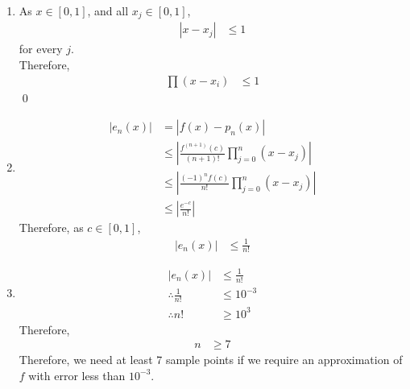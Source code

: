 \documentclass[fleqn, a4paper, 11pt, oneside]{amsart}
\theoremstyle{definition}
\theoremstyle{theorem}
\begin{document}
\begin{solution}
	\begin{enumerate}[leftmargin = *]
		\item
			As $x \in [0,1]$, and all $x_j \in [0,1]$,
			\begin{align*}
				|x - x_j| & \le 1
			\end{align*}
			for every $j$.\\
			Therefore,
			\begin{align*}
				\prod (x - x_i) & \le 1
			\end{align*}
			\qed
		\item
			\begin{align*}
				\left| e_n(x) \right| & = \left| f(x) - p_n(x) \right|                                                        \\
                                                      & \le \left| \frac{f^{(n + 1)}(c)}{(n + 1)!} \prod\limits_{j = 0}^{n} (x - x_j) \right| \\
                                                      & \le \left| \frac{(-1)^{n}f(c)}{n!} \prod\limits_{j = 0}^{n} (x - x_j) \right|         \\
                                                      & \le \left| \frac{e^{-c}}{n!} \right|
			\end{align*}
			Therefore, as $c \in [0,1]$,
			\begin{align*}
				\left| e_n(x) \right| & \le \frac{1}{n!}
			\end{align*}
		\item
			\begin{align*}
				\left| e_n(x) \right|   & \le \frac{1}{n!} \\
				\therefore \frac{1}{n!} & \le 10^{-3}      \\
				\therefore n!           & \ge 10^3
			\end{align*}
			Therefore,
			\begin{align*}
				n & \ge 7
			\end{align*}
			Therefore, we need at least 7 sample points if we require an approximation of $f$ with error less than $10^{-3}$.
	\end{enumerate}
\end{solution}
\end{document}
